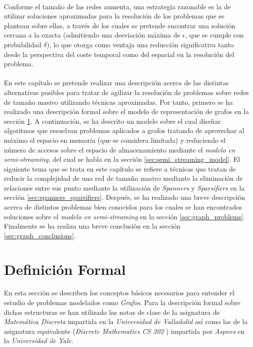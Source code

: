 \documentclass{subfiles}
\begin{document}
      \paragraph{}
      Conforme el tamaño de las redes aumenta, una estrategia razonable es la de utilizar soluciones aproximadas para la resolución de los problemas que se plantean sobre ellas, a través de los cuales se pretende encontrar una solución cercana a la exacta (admitiendo una desviación máxima de $\epsilon$, que se cumple con probabilidad $\delta$), lo que otorga como ventaja una reducción significativa tanto desde la perspectiva del coste temporal como del espacial en la resolución del problema.

      \paragraph{}
      En este capítulo se pretende realizar una descripción acerca de las distintas alternativas posibles para tratar de agilizar la resolución de problemas sobre redes de tamaño masivo utilizando técnicas aproximadas. Por tanto, primero se ha realizado una descripción formal sobre el modelo de representación de grafos en la sección \ref{sec:graph_formalism}. A continuación, se ha descrito un modelo sobre el cual diseñar algoritmos que resuelvan problemas aplicados a grafos tratando de aprovechar al máximo el espacio en memoria (que se considera limitada) y reduciendo el número de accesos sobre el espacio de almacenamiento mediante el \emph{modelo en semi-streaming}, del cual se habla en la sección \ref{sec:semi_streaming_model}. El siguiente tema que se trata en este capítulo se refiere a técnicas que tratan de reducir la complejidad de una red de tamaño masivo mediante la eliminación de relaciones entre sus punto mediante la utilización de \emph{Spanners} y \emph{Sparsifiers} en la sección \ref{sec:spanners_sparsifiers}. Después, se ha realizado una breve descripción acerca de distintos problemas bien conocidos para los cuales se han encontrados soluciones sobre el \emph{modelo en semi-streaming} en la sección \ref{sec:graph_problems}. Finalmente se ha realiza una breve conclusión en la sección \ref{sec:graph_conclusions}.

    \section{Definición Formal}
    \label{sec:graph_formalism}

      \paragraph{}
      En esta sección se describen los conceptos básicos necesarios para entender el estudio de problemas modelados como \emph{Grafos}. Para la descripción formal sobre dichas estructuras se han utilizado las notas de clase de la asignatura de \emph{Matemática Discreta} \cite{matematicaDiscreta2016notes} impartida en la \emph{Universidad de Valladolid} así como las de la asignatura equivalente (\emph{Discrete Mathematics CS 202} \cite{aspnes2013notes}) impartida por \emph{Aspnes} en la \emph{Universidad de Yale}.
\end{document}
